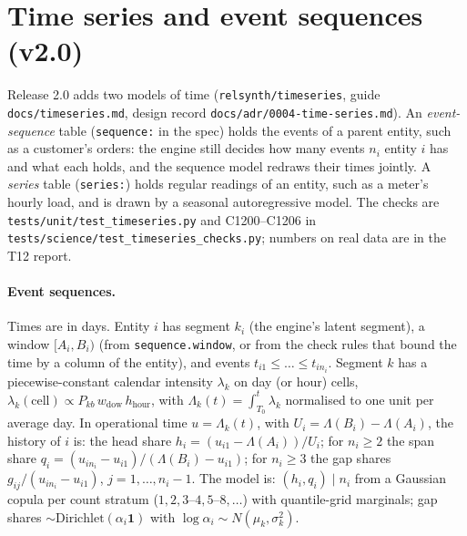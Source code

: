 \section{Time series and event sequences (v2.0)}\label{sec:v32ts}
\setcounter{savedpropts}{\value{proposition}}
\setcounter{proposition}{1199}
Release 2.0 adds two models of time (\texttt{relsynth/timeseries}, guide \texttt{docs/timeseries.md}, design record
\texttt{docs/adr/0004-time-series.md}). An \emph{event-sequence} table (\texttt{sequence:} in the spec) holds the
events of a parent entity, such as a customer's orders: the engine still decides how many events $n_i$ entity $i$
has and what each holds, and the sequence model redraws their times jointly. A \emph{series} table
(\texttt{series:}) holds regular readings of an entity, such as a meter's hourly load, and is drawn by a seasonal
autoregressive model. The checks are \texttt{tests/unit/test\_timeseries.py} and C1200--C1206 in
\texttt{tests/science/test\_timeseries\_checks.py}; numbers on real data are in the T12 report.

\paragraph{Event sequences.} Times are in days. Entity $i$ has segment $k_i$ (the engine's latent segment), a window
$[A_i,B_i)$ (from \texttt{sequence.window}, or from the check rules that bound the time by a column of the entity),
and events $t_{i1}\le\dots\le t_{in_i}$. Segment $k$ has a piecewise-constant calendar intensity $\lambda_k$ on day
(or hour) cells, $\lambda_k(\text{cell})\propto P_{kb}\,w_{\mathrm{dow}}\,h_{\mathrm{hour}}$, with
$\Lambda_k(t)=\int_{T_0}^t\lambda_k$ normalised to one unit per average day. In operational time $u=\Lambda_k(t)$,
with $U_i=\Lambda(B_i)-\Lambda(A_i)$, the history of $i$ is: the head share $h_i=(u_{i1}-\Lambda(A_i))/U_i$; for
$n_i\ge2$ the span share $q_i=(u_{in_i}-u_{i1})/(\Lambda(B_i)-u_{i1})$; for $n_i\ge3$ the gap shares
$g_{ij}/(u_{in_i}-u_{i1})$, $j=1,\dots,n_i-1$. The model is: $(h_i,q_i)\mid n_i$ from a Gaussian copula per count
stratum ($1,2,3$--$4,5$--$8,\dots$) with quantile-grid marginals; gap shares
$\sim\mathrm{Dirichlet}(\alpha_i\mathbf 1)$ with $\log\alpha_i\sim N(\mu_k,\sigma_k^2)$.

